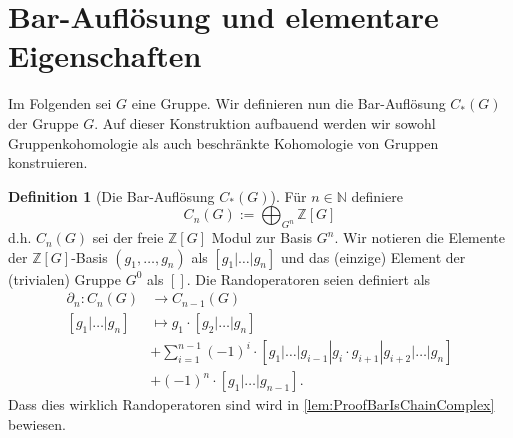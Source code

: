 \documentclass[a4paper,twoside,10pt]{scrreprt}
\newcommand{\Z}{\mathbb{Z}}
\newcommand{\N}{\mathbb{N}}
\theoremstyle{definition}
\newtheorem{definition}[satz]{Definition}
\begin{document}
\section{Bar-Auflösung und elementare Eigenschaften}
Im Folgenden sei $G$ eine Gruppe.
Wir definieren nun die Bar-Auflösung $C_*(G)$ der Gruppe $G$. Auf dieser Konstruktion aufbauend werden wir sowohl Gruppenkohomologie als auch beschränkte Kohomologie von Gruppen konstruieren.
\begin{definition}[Die Bar-Auflösung $C_*(G)$]\label{def:BarRes}
Für $n\in \N$ definiere
\begin{equation*}
C_n(G):=\bigoplus_{G^n} \Z[G]
\end{equation*}
d.h. $C_n(G)$ sei der freie $\Z[G]$ Modul zur Basis $G^n$. Wir notieren die Elemente der $\Z[G]$-Basis $(g_1,\ldots,g_n)$ als $[g_1|\ldots|g_n]$ und das (einzige) Element der (trivialen) Gruppe $G^0$ als $[]$.
Die Randoperatoren seien definiert als
\begin{align*}
\partial_n:C_n(G)&\to C_{n-1}(G)\\
[g_1|\ldots|g_n]&\mapsto g_1\cdot [g_2|\ldots|g_n]\\ 
&+\sum\limits_{i=1}^{n-1} (-1)^i\cdot [g_1|\ldots|g_{i-1}|g_i\cdot g_{i+1}|g_{i+2}|\ldots|g_n]\\
&+(-1)^n\cdot [g_1|\ldots|g_{n-1}].
\end{align*}
Dass dies wirklich Randoperatoren sind wird in \cref{lem:ProofBarIsChainComplex} bewiesen.
\end{definition}
\end{document}
